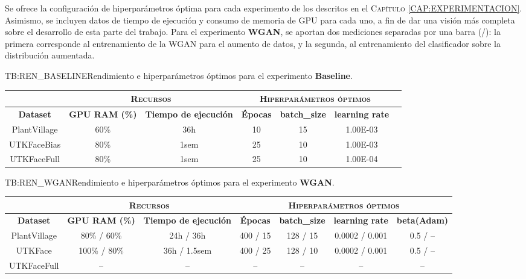 Se ofrece la configuración de hiperparámetros óptima para cada experimento de los descritos en el \textsc{Capítulo \ref{CAP:EXPERIMENTACION}}. Asimismo, se incluyen datos de tiempo de ejecución y consumo de memoria de GPU para cada uno, a fin de dar una visión más completa sobre el desarrollo de esta parte del trabajo. Para el experimento \textbf{WGAN}, se aportan dos mediciones separadas por una barra (/): la primera corresponde al entrenamiento de la WGAN para el aumento de datos, y la segunda, al entrenamiento del clasificador sobre la distribución aumentada.

\begin{table}[Rendimiento Baseline]{TB:REN_BASELINE}{Rendimiento e hiperparámetros óptimos para el experimento \textbf{Baseline}.}
    \small
    \begin{tabular}{|c|c|c|c|c|c|c|}
    \hline
         &  \multicolumn{2}{c|}{\textsc{Recursos}} & \multicolumn{3}{c|}{\textsc{Hiperparámetros óptimos}} \\ \hline
        \textbf{Dataset} & \textbf{GPU RAM (\%)} & \textbf{Tiempo de ejecución} & \textbf{Épocas} & \textbf{batch\_size} & \textbf{learning rate} \\ \hline
        PlantVillage & 60\% & 36h & 10 & 15 & 1.00E-03 \\ \hline
        UTKFaceBias & 80\% & 1sem & 25 & 10 & 1.00E-03 \\ \hline
        UTKFaceFull & 80\% & 1sem & 25 & 10 & 1.00E-04 \\ \hline
    \end{tabular}
\end{table}

\begin{table}[Rendimiento WGAN]{TB:REN_WGAN}{Rendimiento e hiperparámetros óptimos para el experimento \textbf{WGAN}.}
    \small
    \begin{tabular}{|c|c|c|c|c|c|c|}
    \hline
         &  \multicolumn{2}{c|}{\textsc{Recursos}} & \multicolumn{4}{c|}{\textsc{Hiperparámetros óptimos}} \\ \hline
        \textbf{Dataset} & \textbf{GPU RAM (\%)} & \textbf{Tiempo de ejecución} & \textbf{Épocas} & \textbf{batch\_size} & \textbf{learning rate} & \textbf{beta(Adam)} \\ \hline
        PlantVillage & 80\% / 60\% & 24h / 36h & 400 / 15 & 128 / 15 & 0.0002 / 0.001 & 0.5 / -- \\ \hline
        UTKFace & 100\% / 80\% & 36h / 1.5sem & 400 / 25 & 128 / 10 & 0.0002 / 0.001 & 0.5 / -- \\ \hline
        UTKFaceFull & -- & -- & -- & -- & -- & -- \\ \hline
    \end{tabular}
\end{table}

